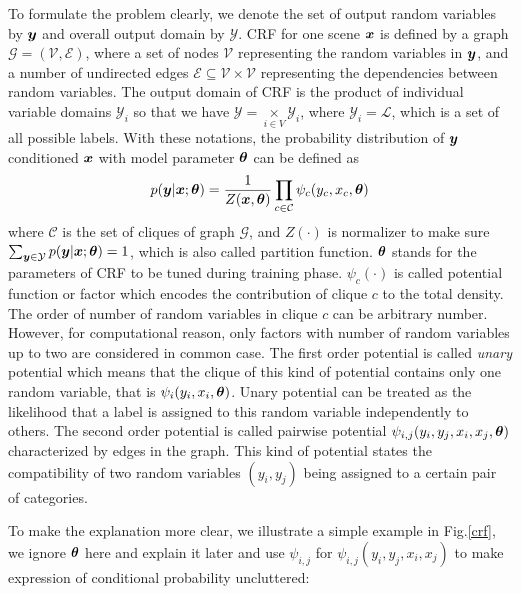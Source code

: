 To formulate the problem clearly, we denote the set of output random variables by $\boldsymbol y$ and overall output domain by $\mathcal{Y}$. \gls{CRF} for one scene $\boldsymbol x$ is defined by a graph $\mathcal{G} = (\mathcal{V}, \mathcal{E})$, where a set of nodes $\mathcal{V}$ representing the random variables in $\boldsymbol y$, and a number of undirected edges $\mathcal{E}\subseteq\mathcal{V}\times\mathcal{V}$ representing the dependencies between random variables. The output domain of \gls{CRF} is the product of individual variable domains $\mathcal{Y}_i$ so that we have $\mathcal{Y} = \underset{i\in V}{\times} \mathcal{Y}_i$, where $\mathcal{Y}_i = \mathcal{L}$, which is a set of all possible labels. With these notations, the probability distribution of $\boldsymbol y$ conditioned $\boldsymbol x$ with model parameter $\boldsymbol \theta$ can be defined as 
\begin{equation}
\label{crf}
\begin{aligned}
p(\boldsymbol y|\boldsymbol x; \boldsymbol \theta) = \frac{1}{Z(\boldsymbol x, \boldsymbol \theta)}\prod_{c\in\mathcal{C}}\psi_{c}(y_c, x_c, \boldsymbol \theta)
\end{aligned}
\end{equation}
where $\mathcal{C}$ is the set of cliques of graph $\mathcal{G}$, and $Z(\cdot)$ is normalizer to make sure $\sum_{\boldsymbol y \in \mathcal{Y}}p(\boldsymbol y | \boldsymbol x; \boldsymbol \theta) = 1$, which is also called partition function. $\boldsymbol \theta$ stands for the parameters of \gls{CRF} to be tuned during training phase. $\psi_c(\cdot)$ is called potential function or factor which encodes the contribution of clique $c$ to the total density. The order of number of random variables in clique $c$ can be arbitrary number. However, for computational reason, only factors with number of random variables up to two are considered in common case. The first order potential is called \textit{unary} potential which means that the clique of this kind of potential contains only one random variable, that is $\psi_i(y_i, x_i, \boldsymbol \theta)$. Unary potential can be treated as the likelihood that a label is assigned to this random variable independently to others. The second order potential is called pairwise potential $\psi_{i,j}(y_i,y_j, x_i, x_j, \boldsymbol \theta)$ characterized by edges in the graph. This kind of potential states the compatibility of two random variables $(y_i,y_j)$ being assigned to a certain pair of categories. 

To make the explanation more clear, we illustrate a simple example in Fig.\ref{crf}, we ignore $\boldsymbol \theta$ here and explain it later and use $\psi_{i,j}$ for $\psi_{i,j}(y_i,y_j,x_i,x_j)$ to make expression of conditional probability uncluttered:

